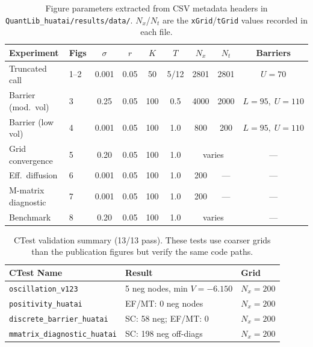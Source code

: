 \documentclass[11pt]{article}
\begin{document}
\begin{table}[htbp]
\centering
\caption{Figure parameters extracted from CSV metadata headers in
  \texttt{QuantLib\_huatai/results/data/}. $N_x$/$N_t$ are the
  \texttt{xGrid}/\texttt{tGrid} values recorded in each file.}
\label{tab:params}
\begin{tabular}{@{}llccccccc@{}}
\toprule
Experiment & Figs & $\sigma$ & $r$ & $K$ & $T$ & $N_x$ & $N_t$ & Barriers \\
\midrule
Truncated call       & 1--2 & 0.001 & 0.05 & 50  & 5/12 & 2801  & 2801 & $U\!=\!70$ \\
Barrier (mod.\ vol)  & 3    & 0.25  & 0.05 & 100 & 0.5  & 4000  & 2000 & $L\!=\!95,\;U\!=\!110$ \\
Barrier (low vol)    & 4    & 0.001 & 0.05 & 100 & 1.0  & 800   & 200  & $L\!=\!95,\;U\!=\!110$ \\
Grid convergence     & 5    & 0.20  & 0.05 & 100 & 1.0  & \multicolumn{2}{c}{varies} & --- \\
Eff.\ diffusion      & 6    & 0.001 & 0.05 & 100 & 1.0  & 200   & ---  & --- \\
M-matrix diagnostic  & 7    & 0.001 & 0.05 & 100 & 1.0  & 200   & ---  & --- \\
Benchmark            & 8    & 0.20  & 0.05 & 100 & 1.0  & \multicolumn{2}{c}{varies} & --- \\
\bottomrule
\end{tabular}
\end{table}

\begin{table}[htbp]
\centering
\caption{CTest validation summary (13/13 pass). These tests use
  coarser grids than the publication figures but verify the same code paths.}
\label{tab:ctest}
\begin{tabular}{@{}lll@{}}
\toprule
CTest Name & Result & Grid \\
\midrule
\texttt{oscillation\_v123}          & 5 neg nodes, min $V = -6.150$  & $N_x\!=\!200$ \\
\texttt{positivity\_huatai}         & EF/MT: 0 neg nodes             & $N_x\!=\!200$ \\
\texttt{discrete\_barrier\_huatai}  & SC: 58 neg; EF/MT: 0           & $N_x\!=\!200$ \\
\texttt{mmatrix\_diagnostic\_huatai}& SC: 198 neg off-diags          & $N_x\!=\!200$ \\
\bottomrule
\end{tabular}
\end{table}
\end{document}
